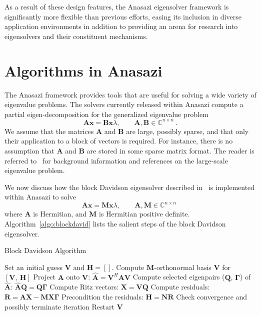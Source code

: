 \documentclass[acmtoms,acmnow]{acmtrans2m}
\begin{document}
As a result of these design features, the Anasazi eigensolver framework is significantly
more flexible than previous efforts, easing its inclusion in diverse application
environments in addition to providing an arena for research into eigensolvers and their
constituent mechanisms. 

\section{Algorithms in Anasazi}
\label{sec:algorithm-overview}

The Anasazi framework provides tools that are useful for solving a
wide variety of eigenvalue problems. The solvers currently released
within Anasazi compute a partial eigen-decomposition for the
generalized eigenvalue problem
\begin{equation}  \label{eq:EigenproblemDefinition}
  \mathbf{A} \mathbf{x} = \mathbf{B} \mathbf{x} \lambda , \qquad
  \mathbf{A}, \mathbf{B} \in \mathbb{C}^{n\times n}\ .
\end{equation}
We assume that the matrices $\mathbf{A}$ and $\mathbf{B}$ are large,
possibly sparse, and that only their application to a block of
vectors is required. For instance, there is no assumption that
$\mathbf{A}$ and $\mathbf{B}$ are stored in some sparse matrix format. The
reader is referred to~\cite{saad:92,sore:02,stew:01book,vors:02} for
background information and references on the large-scale eigenvalue
problem.

We now discuss how the block Davidson eigensolver described
in~\cite{Arbenz:2005:ACE} is implemented within Anasazi to solve
\begin{equation}  \label{eq:EigenproblemDefinitionDavidson}
  \mathbf{A} \mathbf{x} = \mathbf{M} \mathbf{x} \lambda , \qquad
  \mathbf{A}, \mathbf{M} \in \mathbb{C}^{n\times n}\ \,
\end{equation}
where $\mathbf{A}$ is Hermitian, and $\mathbf{M}$ is Hermitian
positive definite. Algorithm~\ref{algo:blockdavid} lists the salient
steps of the block Davidson eigensolver.

\begin{algorithm}
\begin{algorithmic}[1]
\caption{Block Davidson Algorithm}
\label{algo:blockdavid}
\REQUIRE
Set an initial guess $\mathbf{V}$ and $\mathbf{H} = []$.
\REPEAT
\STATE
Compute $\mathbf{M}$-orthonormal basis $\mathbf{V}$ for
$\left[ \mathbf{V}, \ \mathbf{H} \right]$
\STATE
Project $\mathbf{A}$ onto $\mathbf{V}$:
$\mathbf{\hat{A}} = \mathbf{V}^H \mathbf{A} \mathbf{V}$
\STATE
Compute selected eigenpairs ($\mathbf{Q}$, $\mathbf{\Gamma}$)
of $\mathbf{\hat{A}}$:
$\mathbf{\hat{A}} \mathbf{Q} = \mathbf{Q} \mathbf{\Gamma}$
\STATE
Compute Ritz vectors:
$\mathbf{X} = \mathbf{V} \mathbf{Q}$
\STATE
Compute residuals:
$\mathbf{R} = \mathbf{A} \mathbf{X} -
\mathbf{M} \mathbf{X} \mathbf{\Gamma}$
\STATE
Precondition the residuals:
$\mathbf{H} = \mathbf{N}\mathbf{R}$
\STATE
Check convergence and possibly terminate iteration
\STATE
Restart $\mathbf{V}$
\ENDFOR
\end{algorithmic}
\end{algorithm}
\end{document}
